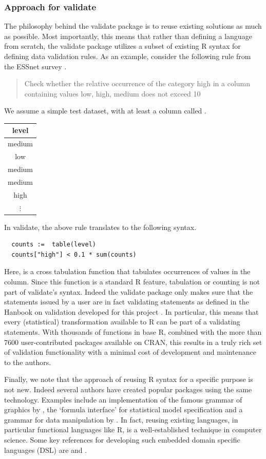 \subsubsection{Approach for validate}
The philosophy behind the validate package is to reuse existing solutions as
much as possible. Most importantly, this means that rather than defining a
language from scratch, the validate package utilizes a subset of existing R
syntax for defining data validation rules. As an example, consider the following rule from the ESSnet survey \citep{walsdorfer:2015}.
\begin{quote}
Check whether the relative occurrence of the category high in a column
containing values low, high, medium does not exceed 10%
\end{quote}
We assume a simple test dataset, with at least a column called .
\begin{center}
\begin{tabular}{|c|}
\hline
\textbf{level}\\
\hline
medium\\
\hline
low\\
\hline
medium\\
\hline
medium\\
\hline
high\\
\hline
$\vdots$\\
\hline
\end{tabular}
\end{center}
In validate, the above rule translates to the following syntax.
\begin{verbatim}
  counts :=  table(level)
  counts["high"] < 0.1 * sum(counts)
\end{verbatim}
Here,  is a cross tabulation function that tabulates occurrences
of values in the  column. Since this function is a standard R
feature, tabulation or counting is not part of validate's syntax. Indeed the
validate package only makes sure that the statements issued by a user are in
fact validating statements as defined in the Hanbook on validation developed
for this project \citep{zio:2015}. In particular, this means that every
(statistical) transformation available to R can be part of a validating
statements.  With thousands of functions in base R, combined with the more than
7600 user-contributed packages available on CRAN, this results in a truly rich
set of validation functionality with a minimal cost of development and
maintenance to the authors.

Finally, we note that the approach of reusing R syntax for a specific purpose
is not new. Indeed several authors have created popular packages using the same
technology. Examples include an implementation of the famous grammar of
graphics \citep{wilkinson:2006} by \citet{wickham:2014}, the  `formula
interface' for statistical model specification and a grammar for data
manipulation by \cite{wickham:2014}. In fact, reusing existing languages, in
particular functional languages like R, is a well-established technique in
computer science.  Some key references for developing such embedded domain
specific languages (DSL) are \cite{fowler:2011} and \cite{gibbons:2015}.


